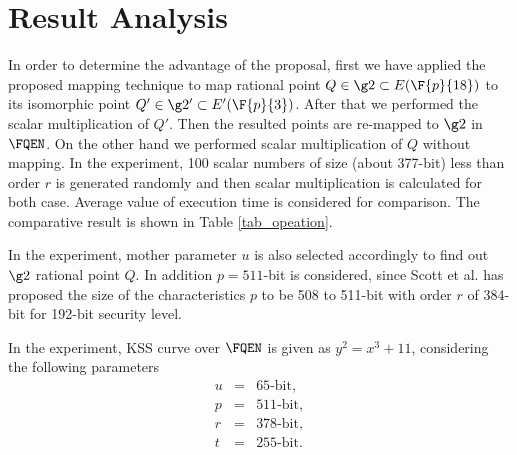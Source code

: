         
        \section{Result Analysis}
        In order to determine the advantage of the proposal, first we have applied the proposed mapping technique to map rational point $Q \in \g2 \subset E(\F{p}{18})$ to its isomorphic point $Q' \in \g2' \subset E'(\F{p}{3})$. After that we performed the scalar multiplication of $Q'$. Then the resulted points are re-mapped to $\g2$ in $\FQEN$. On the other hand we performed scalar multiplication of $Q$ without mapping. In the experiment, 100 scalar numbers of size (about 377-bit) less than order $r$ is generated randomly and then scalar multiplication is calculated for both case. Average value of execution time is considered for comparison.
        The comparative result is shown in Table \ref{tab_opeation}.
        
        In the experiment, mother parameter $u$ is also selected accordingly to find out $\g2$ rational point $Q$. In addition $p=511$-bit is considered, since Scott et al. \cite{IMA:Scott11} has proposed the size of the characteristics $p$ to be 508 to 511-bit with order $r$ of 384-bit for 192-bit security level.
        
        In the experiment, KSS curve over $\FQEN$ is given as $y^2 = x^3 + 11$, considering the following parameters
        \begin{eqnarray}
        u & = & 65   \mbox{-bit},  \nonumber \\ 
        p  & = & 511 \mbox{-bit},  \nonumber \\ 
        r  & = & 378 \mbox{-bit} ,\nonumber \\ 
        t  & = & 255  \mbox{-bit}. \nonumber
        \end{eqnarray}
        
